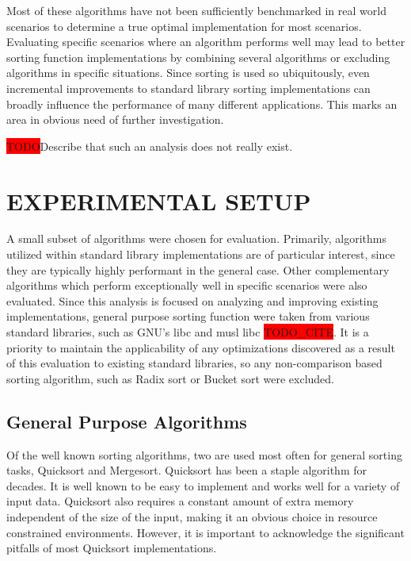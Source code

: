 \documentclass[letter, 12pt, conference]{ieeeconf}
\newcommand{\todo}{\colorbox{red}{TODO}}
\newcommand{\todocite}{\colorbox{red}{TODO\_CITE}}
\begin{document}
Most of these algorithms have not been sufficiently benchmarked in real world
scenarios to determine a true optimal implementation for most scenarios.
Evaluating specific scenarios where an algorithm performs well may lead to
better sorting function implementations by combining several algorithms or
excluding algorithms in specific situations. Since sorting is used so
ubiquitously, even incremental improvements to standard library sorting
implementations can broadly influence the performance of many different
applications. This marks an area in obvious need of further investigation.

\todo Describe that such an analysis does not really exist.

\section{EXPERIMENTAL SETUP}

A small subset of algorithms were chosen for evaluation. Primarily, algorithms
utilized within standard library implementations are of particular interest,
since they are typically highly performant in the general case. Other
complementary algorithms which perform exceptionally well in specific scenarios
were also evaluated. Since this analysis is focused on analyzing and improving
existing implementations, general purpose sorting function were taken from
various standard libraries, such as GNU's libc and musl libc \todocite. It is a
priority to maintain the applicability of any optimizations discovered as a
result of this evaluation to existing standard libraries, so any non-comparison
based sorting algorithm, such as Radix sort or Bucket sort were excluded.


\subsection{General Purpose Algorithms}

Of the well known sorting algorithms, two are used most often for general
sorting tasks, Quicksort and Mergesort. Quicksort has been a staple algorithm
for decades. It is well known to be easy to implement and works well for a
variety of input data. Quicksort also requires a constant amount of extra memory
independent of the size of the input, making it an obvious choice in resource
constrained environments. However, it is important to acknowledge the
significant pitfalls of most Quicksort implementations.
\end{document}

